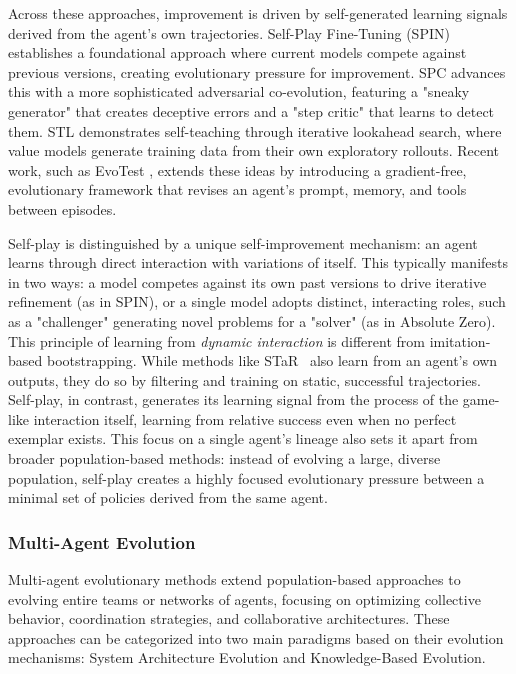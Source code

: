 Across these approaches, improvement is driven by self-generated learning signals derived from the agent’s own trajectories. Self-Play Fine-Tuning (SPIN) \citep{chen2024self} establishes a foundational approach where current models compete against previous versions, creating evolutionary pressure for improvement. SPC \citep{chen2025spc} advances this with a more sophisticated adversarial co-evolution, featuring a "sneaky generator" that creates deceptive errors and a "step critic" that learns to detect them. STL \citep{mendes2025language} demonstrates self-teaching through iterative lookahead search, where value models generate training data from their own exploratory rollouts. Recent work, such as EvoTest \citep{he2025evotest}, extends these ideas by introducing a gradient-free, evolutionary framework that revises an agent’s prompt, memory, and tools between episodes.

Self-play is distinguished by a unique self-improvement mechanism: an agent learns through direct interaction with variations of itself. This typically manifests in two ways: a model competes against its own past versions to drive iterative refinement (as in SPIN), or a single model adopts distinct, interacting roles, such as a "challenger" generating novel problems for a "solver" (as in Absolute Zero). This principle of learning from \textit{dynamic interaction} is different from imitation-based bootstrapping. While methods like STaR~\citep{zelikman2022star} also learn from an agent's own outputs, they do so by filtering and training on static, successful trajectories. Self-play, in contrast, generates its learning signal from the process of the game-like interaction itself, learning from relative success even when no perfect exemplar exists. This focus on a single agent's lineage also sets it apart from broader population-based methods: instead of evolving a large, diverse population, self-play creates a highly focused evolutionary pressure between a minimal set of policies derived from the same agent.



\subsubsection{Multi-Agent Evolution}

Multi-agent evolutionary methods extend population-based approaches to evolving entire teams or networks of agents, focusing on optimizing collective behavior, coordination strategies, and collaborative architectures. These approaches can be categorized into two main paradigms based on their evolution mechanisms: System Architecture Evolution and Knowledge-Based Evolution.

